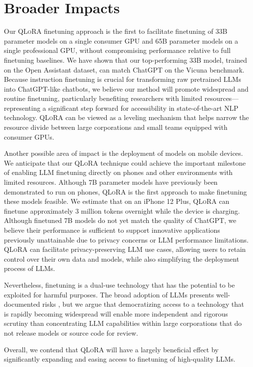 \section{Broader Impacts}

Our \textsc{QLoRA} finetuning approach is the first to facilitate finetuning of 33B parameter models on a single consumer GPU and 65B parameter models on a single professional GPU, without compromising performance relative to full finetuning baselines. We have shown that our top-performing 33B model, trained on the Open Assistant dataset, can match ChatGPT on the Vicuna benchmark. Because instruction finetuning is crucial for transforming raw pretrained LLMs into ChatGPT-like chatbots, we believe our method will promote widespread and routine finetuning, particularly benefiting researchers with limited resources—representing a significant step forward for accessibility in state-of-the-art NLP technology. \textsc{QLoRA} can be viewed as a leveling mechanism that helps narrow the resource divide between large corporations and small teams equipped with consumer GPUs.

Another possible area of impact is the deployment of models on mobile devices. We anticipate that our \textsc{QLoRA} technique could achieve the important milestone of enabling LLM finetuning directly on phones and other environments with limited resources. Although 7B parameter models have previously been demonstrated to run on phones, \textsc{QLoRA} is the first approach to make finetuning these models feasible. We estimate that on an iPhone 12 Plus, \textsc{QLoRA} can finetune approximately 3 million tokens overnight while the device is charging. Although finetuned 7B models do not yet match the quality of ChatGPT, we believe their performance is sufficient to support innovative applications previously unattainable due to privacy concerns or LLM performance limitations. \textsc{QLoRA} can facilitate privacy-preserving LLM use cases, allowing users to retain control over their own data and models, while also simplifying the deployment process of LLMs.

Nevertheless, finetuning is a dual-use technology that has the potential to be exploited for harmful purposes. The broad adoption of LLMs presents well-documented risks \citep{bommasani2021opportunities,bender2021dangers}, but we argue that democratizing access to a technology that is rapidly becoming widespread will enable more independent and rigorous scrutiny than concentrating LLM capabilities within large corporations that do not release models or source code for review.

Overall, we contend that \textsc{QLoRA} will have a largely beneficial effect by significantly expanding and easing access to finetuning of high-quality LLMs.


